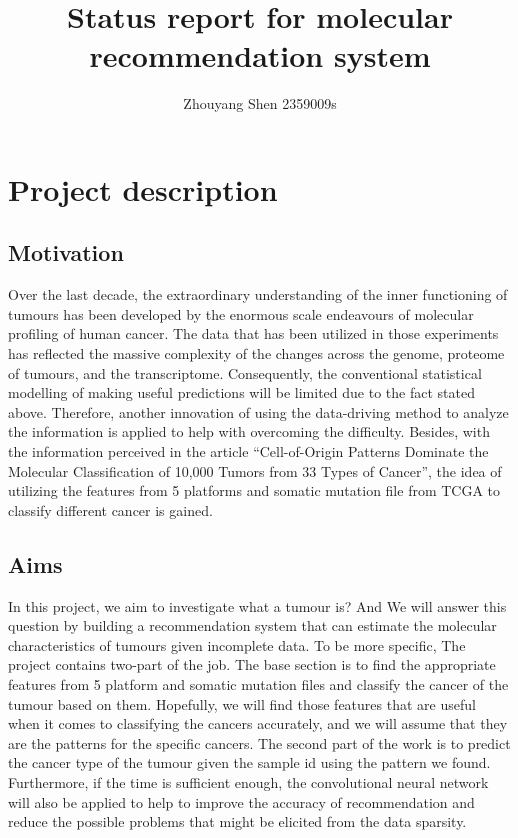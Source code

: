 \documentclass[11pt]{article}
\title{Status report for molecular recommendation system}
\author{Zhouyang Shen 2359009s}
\begin{document}
    \maketitle






\section{Project description}\label{project-description}

\subsection{Motivation}\label{motivation}
Over the last decade, the extraordinary understanding of the inner functioning of tumours has been developed by the enormous scale endeavours of molecular profiling of human cancer. The data that has been utilized in those experiments has reflected the massive complexity of the changes across the genome, proteome of tumours, and the transcriptome. Consequently, the conventional statistical modelling of making useful predictions will be limited due to the fact stated above. Therefore, another innovation of using the data-driving method to analyze the information is applied to help with overcoming the difficulty. Besides, with the information perceived in the article “Cell-of-Origin Patterns Dominate the Molecular Classification of 10,000 Tumors from 33 Types of Cancer”, the idea of utilizing the features from 5 platforms and somatic mutation file from TCGA to classify different cancer is gained.


\subsection{Aims}\label{aims}
In this project, we aim to investigate what a tumour is? And We will answer this question by building a recommendation system that can estimate the molecular characteristics of tumours given incomplete data. To be more specific, The project contains two-part of the job. The base section is to find the appropriate features from 5 platform and somatic mutation files and classify the cancer of the tumour based on them. Hopefully, we will find those features that are useful when it comes to classifying the cancers accurately, and we will assume that they are the patterns for the specific cancers. The second part of the work is to predict the cancer type of the tumour given the sample id using the pattern we found. Furthermore, if the time is sufficient enough, the convolutional neural network will also be applied to help to improve the accuracy of recommendation and reduce the possible problems that might be elicited from the data sparsity.
\end{document}
